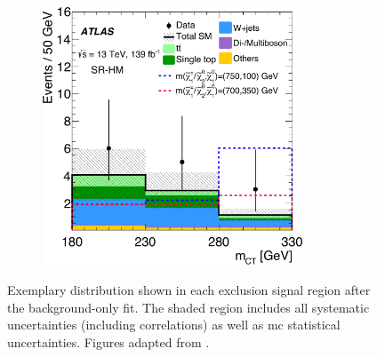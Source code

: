 \begin{figure}
\begin{subfigure}[b]{0.5\linewidth}
	\end{subfigure}\hfill
	\par\bigskip
	\par\bigskip
	\begin{subfigure}[b]{0.5\linewidth}
		\centering\includegraphics[width=0.85\textwidth]{fig_05c_yellow}
	\end{subfigure}\hfill

	\caption{Exemplary distribution shown in each exclusion signal region after the background-only fit. The shaded region includes all systematic uncertainties (including correlations) as well as \gls{mc} statistical uncertainties. Figures adapted from \cite{SUSY-2019-08}.}
	\label{fig:SR_distributions_postfit}
\end{figure}


